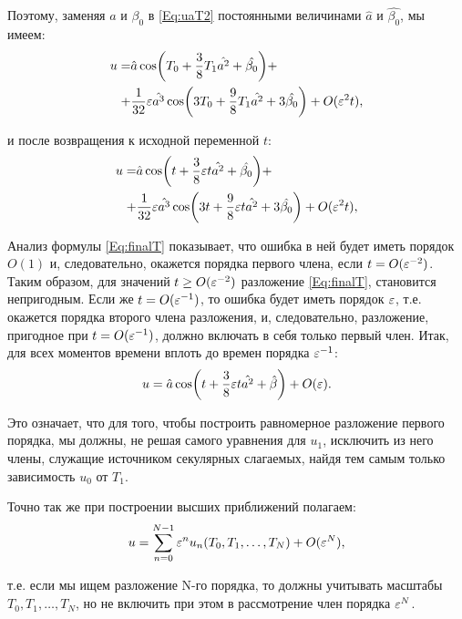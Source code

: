 Поэтому, заменяя $a$ и $\beta_0$ в \eqref{Eq:uaT2} постоянными величинами
$\hat{a}$ и $\hat{\beta_0}$, мы имеем:
\begin{align*}
    u = & \hat{a} \cos(T_0 + \frac{3}{8} T_1 \hat{a^2} + \hat{\beta_0}) + \\
    + & \frac{1}{32} \varepsilon \hat{a^3} \cos(3 T_0 + \frac{9}{8} T_1 \hat{a^2} +
    3 \hat{\beta_0} ) + O(\varepsilon^2 t),
\end{align*}

и после возвращения к исходной переменной $t$:
\begin{align}
    u = & \hat{a} \cos(t + \frac{3}{8} \varepsilon t \hat{a^2} + \hat{\beta_0}) + \nonumber \\
    + & \frac{1}{32} \varepsilon \hat{a^3} \cos(3 t + \frac{9}{8} \varepsilon t \hat{a^2} +
    3 \hat{\beta_0} ) + O(\varepsilon^2 t), \label{Eq:finalT}
\end{align}

Анализ формулы \eqref{Eq:finalT} показывает,
что ошибка в ней будет иметь порядок $O(1)$ и,
следовательно, окажется порядка первого члена,
если $t = O(\varepsilon^{-2})$. Таким образом,
для значений $t \geq O(\varepsilon^{-2})$ разложение \eqref{Eq:finalT},
становится непригодным. Если же $t = O(\varepsilon^{-1})$,
то ошибка будет иметь порядок $\varepsilon$,
т.е. окажется порядка второго члена разложения, и,
следовательно, разложение, пригодное при $t = O(\varepsilon^{-1})$,
должно включать в себя только первый член.
Итак, для всех моментов времени вплоть до времен порядка $\varepsilon^{-1}$:
\begin{equation*}
    u = \hat{a} \cos(t + \frac{3}{8} \varepsilon t \hat{a^2} + \hat{\beta}) + O(\varepsilon). 
\end{equation*}

Это означает, что для того, чтобы построить равномерное разложение
первого порядка, мы должны, не решая самого уравнения
для $u_1$, исключить из него члены, служащие источником секулярных слагаемых,
найдя тем самым только зависимость $u_0$ от $T_1$.

Точно так же при построении высших приближений полагаем:
\begin{equation*}
    u = \sum_{n=0}^{N-1} \varepsilon^n u_n(T_0, T_1, \dots, T_N) + O(\varepsilon^N), 
\end{equation*}

т.е. если мы ищем разложение N-го порядка,
то должны учитывать масштабы $T_0, T_1, \dots, T_N$,
но не включить при этом в рассмотрение член порядка $\varepsilon^N$.


